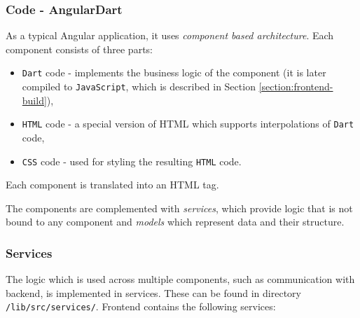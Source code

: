 \subsubsection{Code - AngularDart}
As a typical Angular application, it uses \textit{component based architecture}. Each component consists of three parts:
\begin{itemize}
    \item \texttt{Dart} code - implements the business logic of the component (it is later compiled to \texttt{JavaScript}, which is described in Section \ref{section:frontend-build}),
    \item \texttt{HTML} code - a special version of HTML which supports interpolations of \texttt{Dart} code,
    \item \texttt{CSS} code - used for styling the resulting \texttt{HTML} code.
\end{itemize}
Each component is translated into an HTML tag.

The components are complemented with \textit{services}, which provide logic that is not bound to any component and \textit{models} which represent data and their structure.


\subsubsection{Services}
The logic which is used across multiple components, such as communication with backend, is implemented in services. These can be found in directory \texttt{/lib/src/services/}. Frontend contains the following services:

